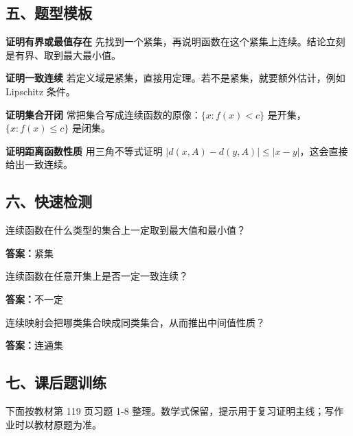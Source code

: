 \subsection*{五、题型模板}

\begin{conceptbox}
\textbf{证明有界或最值存在}
先找到一个紧集，再说明函数在这个紧集上连续。结论立刻是有界、取到最大最小值。
\end{conceptbox}

\begin{conceptbox}
\textbf{证明一致连续}
若定义域是紧集，直接用定理。若不是紧集，就要额外估计，例如 Lipschitz 条件。
\end{conceptbox}

\begin{conceptbox}
\textbf{证明集合开闭}
常把集合写成连续函数的原像：\(\{x:f(x)< c\}\) 是开集，\(\{x:f(x)\le c\}\) 是闭集。
\end{conceptbox}

\begin{conceptbox}
\textbf{证明距离函数性质}
用三角不等式证明 \(|d(x,A)-d(y,A)|\le |x-y|\)，这会直接给出一致连续。
\end{conceptbox}

\subsection*{六、快速检测}

\begin{quickcheck}
连续函数在什么类型的集合上一定取到最大值和最小值？

\tcblower
\textbf{答案：}紧集
\end{quickcheck}

\begin{quickcheck}
连续函数在任意开集上是否一定一致连续？

\tcblower
\textbf{答案：}不一定
\end{quickcheck}

\begin{quickcheck}
连续映射会把哪类集合映成同类集合，从而推出中间值性质？

\tcblower
\textbf{答案：}连通集
\end{quickcheck}

\subsection*{七、课后题训练}

下面按教材第 119 页习题 1-8 整理。数学式保留，提示用于复习证明主线；写作业时以教材原题为准。


